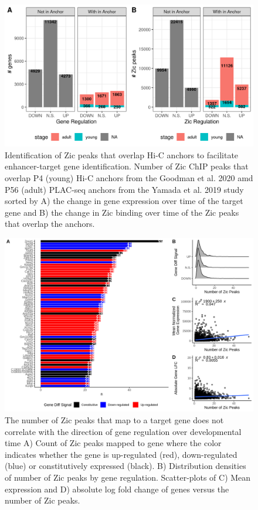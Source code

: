 \documentclass[fleqn,10pt]{wlscirep}
\begin{document}
\begin{figure}[ht]
\centering
\includegraphics[width=.90\linewidth]{../figures/supp_figure_anchor.png}
\caption{ Identification of Zic peaks that overlap Hi-C anchors to facilitate enhancer-target gene identification. Number of Zic ChIP peaks that overlap P4 (young) Hi-C anchors from the Goodman et al. 2020 \cite{Goodman2020TheBrain} amd P56 (adult) PLAC-seq anchors from the Yamada et al. 2019 study \cite{Yamada2019SensoryLearning} sorted by A) the change in gene expression over time of the target gene and B) the change in Zic binding over time of the Zic peaks that overlap the anchors.}
\label{fig:MappingStats}
\end{figure}


\begin{figure}[ht]
\centering
\includegraphics[width=.90\linewidth]{../figures/supp_figure3.png}
\caption{ The number of Zic peaks that map to a target gene does not correlate with the direction of gene regulation over developmental time A) Count of Zic peaks mapped to gene where the color indicates whether the gene is up-regulated (red), down-regulated (blue) or constitutively expressed (black). B) Distribution densities of number of Zic peaks by gene regulation.  Scatter-plots of C) Mean expression and D) absolute log fold change of genes versus the number of Zic peaks. }
\label{fig:npeakstoGenes}
\end{figure}
\end{document}
